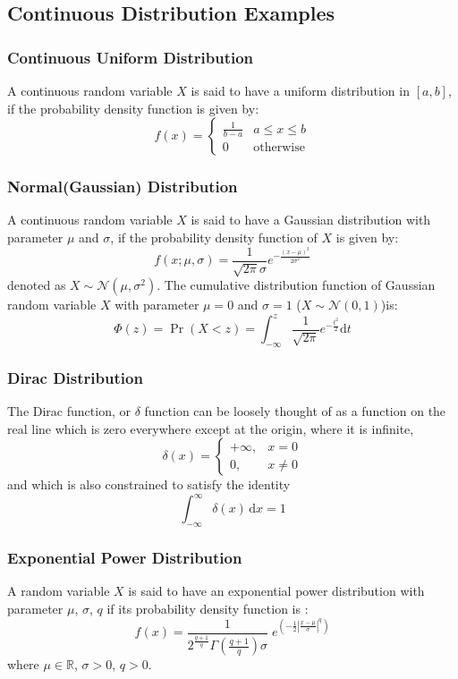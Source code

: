 \documentclass[11pt]{article}
\def\MN{{\mathcal N}}
\def\BR{{\mathbb R}}
\begin{document}
\subsection{Continuous Distribution Examples}
\subsubsection{Continuous Uniform Distribution}
A continuous random variable $X$ is said to have a uniform distribution in $[a,b]$, 
if the probability density function is given by:
\[ f(x)=\begin{cases}
  \frac{1}{b - a} &  a \leq x \leq b \\
  0 & \mbox{otherwise}
  \end{cases} \]

\subsubsection{Normal(Gaussian) Distribution}
A continuous random variable $X$ is said to have a Gaussian distribution with parameter $\mu$ and $\sigma$, if the probability density function of $X$ is given by:
\[f(x; \mu, \sigma) = \frac{1}{\sqrt{2\pi}\sigma} e^{-\frac{(x-\mu)^2}{2\sigma^2}}\]
denoted as $X\sim \MN(\mu, \sigma^2)$. The cumulative distribution function of Gaussian random variable $X$ with parameter $\mu = 0$ and $\sigma = 1$ ($X\sim \MN(0,1)$)is:
\[\Phi(z) = \Pr(X < z) = \int_{-\infty}^z \frac{1}{\sqrt{2\pi}} e^{-\frac{t^2}{2}} \mathrm dt\]

\subsubsection{Dirac Distribution}
The Dirac function, or $\delta$ function can be loosely thought of as a function on the real line which is zero everywhere except at the origin, where it is infinite,
$$\delta(x) = \begin{cases} +\infty, & x = 0 \\ 0, & x \ne 0 \end{cases}$$
and which is also constrained to satisfy the identity
$$\int_{-\infty}^\infty \delta(x) \, \mathrm dx = 1$$
\subsubsection{Exponential Power Distribution}
A random variable $X$ is said to have an exponential power distribution with parameter $\mu$, $\sigma$, $q$ if its probability density function is :
$$
f(x)=\frac{1}{2^{\frac{q+1}{q}}\Gamma(\frac{q+1}{q})\sigma} \; e^{\left(-\frac{1}{2}|\frac{x-\mu}{\sigma}|^q\right)}
$$
where $\mu \in \BR$, $\sigma > 0$, $q > 0$.
\end{document}
